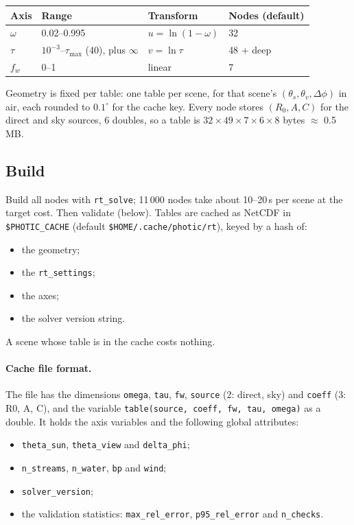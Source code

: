 \documentclass[11pt]{article}
\numberwithin{equation}{section}
\newcommand{\code}[1]{\texttt{#1}}
\begin{document}
\begin{center}
\begin{tabular}{@{}llll@{}}
\toprule
Axis & Range & Transform & Nodes (default)\\
\midrule
$\omega$ & 0.02--0.995 & $u = \ln(1-\omega)$ & 32\\
$\tau$ & $10^{-3}$--$\tau_{\max}$ (40), plus $\infty$ & $v = \ln\tau$ & 48 + deep\\
$f_w$ & 0--1 & linear & 7\\
\bottomrule
\end{tabular}
\end{center}
Geometry is fixed per table: one table per scene, for that scene's $(\theta_s, \theta_v,
\Delta\phi)$ in air, each rounded to $0.1^\circ$ for the cache key. Every node stores $(R_0, A,
C)$ for the direct and sky sources, 6 doubles, so a table is $32\times49\times7\times6\times8$
bytes $\approx$ 0.5\,MB.

\subsection{Build}

Build all nodes with \code{rt\_solve}; 11\,000 nodes take about 10--20\,s per scene at the
target cost. Then validate (below). Tables are cached as NetCDF in \code{\$PHOTIC\_CACHE}
(default \code{\$HOME/.cache/photic/rt}),
keyed by a hash of:
\begin{itemize}
\item the geometry;
\item the \code{rt\_settings};
\item the axes;
\item the solver version string.
\end{itemize}
A scene whose table is in the cache costs nothing.

\paragraph{Cache file format.} The file has the dimensions \code{omega}, \code{tau},
\code{fw}, \code{source} (2: direct, sky) and \code{coeff} (3: R0, A, C), and the variable
\code{table(source, coeff, fw, tau, omega)} as a double. It holds the axis variables and the
following global attributes:
\begin{itemize}
\item \code{theta\_sun}, \code{theta\_view} and \code{delta\_phi};
\item \code{n\_streams}, \code{n\_water}, \code{bp} and \code{wind};
\item \code{solver\_version};
\item the validation statistics: \code{max\_rel\_error}, \code{p95\_rel\_error} and
\code{n\_checks}.
\end{itemize}
\end{document}
